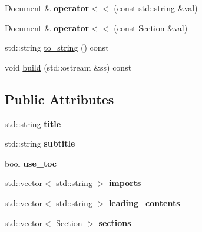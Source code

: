 \begin{DoxyCompactItemize}
\item 
\hypertarget{classlatex_1_1doc_1_1Document_a3bfae6320f6798f236e9d1775ab4a987}{\hyperlink{classlatex_1_1doc_1_1Document}{Document} \& {\bfseries operator$<$$<$} (const std\-::string \&val)}\label{classlatex_1_1doc_1_1Document_a3bfae6320f6798f236e9d1775ab4a987}

\item 
\hypertarget{classlatex_1_1doc_1_1Document_a0d011c1af57eea8b68e5aae4ed546d99}{\hyperlink{classlatex_1_1doc_1_1Document}{Document} \& {\bfseries operator$<$$<$} (const \hyperlink{classlatex_1_1doc_1_1Section}{Section} \&val)}\label{classlatex_1_1doc_1_1Document_a0d011c1af57eea8b68e5aae4ed546d99}

\item 
std\-::string \hyperlink{classlatex_1_1doc_1_1Document_ad62f7f8b1f05f3d6edb2734ba0611913}{to\-\_\-string} () const 
\item 
void \hyperlink{classlatex_1_1doc_1_1Document_a8ae50f6e90452fce2dc036b8fd30a052}{build} (std\-::ostream \&ss) const 
\end{DoxyCompactItemize}
\subsection*{Public Attributes}
\begin{DoxyCompactItemize}
\item 
\hypertarget{classlatex_1_1doc_1_1Document_ae669c421fa782997eae2aed024d7fc53}{std\-::string {\bfseries title}}\label{classlatex_1_1doc_1_1Document_ae669c421fa782997eae2aed024d7fc53}

\item 
\hypertarget{classlatex_1_1doc_1_1Document_a966c4725ea244d9ac8a40335202cb499}{std\-::string {\bfseries subtitle}}\label{classlatex_1_1doc_1_1Document_a966c4725ea244d9ac8a40335202cb499}

\item 
\hypertarget{classlatex_1_1doc_1_1Document_ab7d78e94c5883a7e7adcfa141039d128}{bool {\bfseries use\-\_\-toc}}\label{classlatex_1_1doc_1_1Document_ab7d78e94c5883a7e7adcfa141039d128}

\item 
\hypertarget{classlatex_1_1doc_1_1Document_aa6f47f638c00b57aaed3fca96a7eeab8}{std\-::vector$<$ std\-::string $>$ {\bfseries imports}}\label{classlatex_1_1doc_1_1Document_aa6f47f638c00b57aaed3fca96a7eeab8}

\item 
\hypertarget{classlatex_1_1doc_1_1Document_a69c709a155dcf20df20a353b0d2ec245}{std\-::vector$<$ std\-::string $>$ {\bfseries leading\-\_\-contents}}\label{classlatex_1_1doc_1_1Document_a69c709a155dcf20df20a353b0d2ec245}

\item 
\hypertarget{classlatex_1_1doc_1_1Document_a504d1c3f8c3d3492a13bfb0c249f699f}{std\-::vector$<$ \hyperlink{classlatex_1_1doc_1_1Section}{Section} $>$ {\bfseries sections}}\label{classlatex_1_1doc_1_1Document_a504d1c3f8c3d3492a13bfb0c249f699f}

\end{DoxyCompactItemize}

